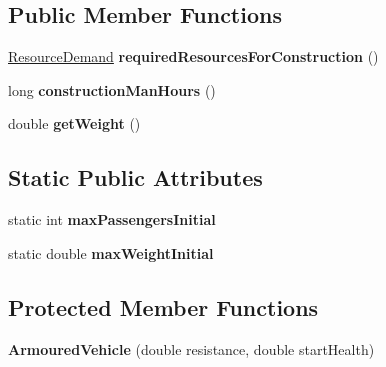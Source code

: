 \subsection*{Public Member Functions}
\begin{DoxyCompactItemize}
\item 
\hyperlink{classuniverse_1_1_resource_demand}{Resource\+Demand} {\bfseries required\+Resources\+For\+Construction} ()\hypertarget{classtools_1_1vehicles_1_1land_1_1_armoured_vehicle_aee93e285d0a5dcf620c7336f35ca6ada}{}\label{classtools_1_1vehicles_1_1land_1_1_armoured_vehicle_aee93e285d0a5dcf620c7336f35ca6ada}

\item 
long {\bfseries construction\+Man\+Hours} ()\hypertarget{classtools_1_1vehicles_1_1land_1_1_armoured_vehicle_a54ba42a15fd708eae10eea3c478ecf71}{}\label{classtools_1_1vehicles_1_1land_1_1_armoured_vehicle_a54ba42a15fd708eae10eea3c478ecf71}

\item 
double {\bfseries get\+Weight} ()\hypertarget{classtools_1_1vehicles_1_1land_1_1_armoured_vehicle_a1b6693eb33c4b935c66f0c3d65e08ca1}{}\label{classtools_1_1vehicles_1_1land_1_1_armoured_vehicle_a1b6693eb33c4b935c66f0c3d65e08ca1}

\end{DoxyCompactItemize}
\subsection*{Static Public Attributes}
\begin{DoxyCompactItemize}
\item 
static int {\bfseries max\+Passengers\+Initial}\hypertarget{classtools_1_1vehicles_1_1land_1_1_armoured_vehicle_a8e1a369eaf0f62d4a5a38e23180da4b1}{}\label{classtools_1_1vehicles_1_1land_1_1_armoured_vehicle_a8e1a369eaf0f62d4a5a38e23180da4b1}

\item 
static double {\bfseries max\+Weight\+Initial}\hypertarget{classtools_1_1vehicles_1_1land_1_1_armoured_vehicle_a3de5db7db5e7aa28337b56b87d768009}{}\label{classtools_1_1vehicles_1_1land_1_1_armoured_vehicle_a3de5db7db5e7aa28337b56b87d768009}

\end{DoxyCompactItemize}
\subsection*{Protected Member Functions}
\begin{DoxyCompactItemize}
\item 
{\bfseries Armoured\+Vehicle} (double resistance, double start\+Health)\hypertarget{classtools_1_1vehicles_1_1land_1_1_armoured_vehicle_ae1527377135893ae160dc20aea6d6753}{}\label{classtools_1_1vehicles_1_1land_1_1_armoured_vehicle_ae1527377135893ae160dc20aea6d6753}

\end{DoxyCompactItemize}

